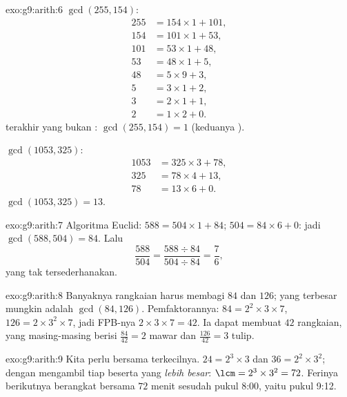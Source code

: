 \begin{solution}{exo:g9:arith:6}
$\gcd(255, 154)$:
\begin{align*}
255 &= 154 \times 1 + 101, \\
154 &= 101 \times 1 + 53, \\
101 &= 53 \times 1 + 48, \\
53 &= 48 \times 1 + 5, \\
48 &= 5 \times 9 + 3, \\
5 &= 3 \times 1 + 2, \\
3 &= 2 \times 1 + 1, \\
2 &= 1 \times 2 + 0 .
\end{align*}
 terakhir yang bukan : $\gcd(255, 154) = 1$ (keduanya ).

$\gcd(1053, 325)$:
\begin{align*}
1053 &= 325 \times 3 + 78, \\
325 &= 78 \times 4 + 13, \\
78 &= 13 \times 6 + 0 .
\end{align*}
$\gcd(1053, 325) = 13$.
\end{solution}

\begin{solution}{exo:g9:arith:7}
Algoritma Euclid: $588 = 504 \times 1 + 84$; $504 = 84 \times 6 + 0$:
jadi $\gcd(588, 504) = 84$. Lalu
\[
\frac{588}{504} = \frac{588 \div 84}{504 \div 84} = \frac{7}{6},
\]
yang tak tersederhanakan.
\end{solution}

\begin{solution}{exo:g9:arith:8}
Banyaknya rangkaian harus membagi $84$ dan $126$; yang terbesar
mungkin adalah $\gcd(84, 126)$. Pemfaktorannya: $84 = 2^2 \times 3
\times 7$, $126 = 2 \times 3^2 \times 7$, jadi FPB-nya
$2 \times 3 \times 7 = 42$. Ia dapat membuat $42$ rangkaian, yang
masing-masing berisi
$\frac{84}{42} = 2$ mawar dan $\frac{126}{42} = 3$ tulip.
\end{solution}

\begin{solution}{exo:g9:arith:9}
Kita perlu  bersama terkecilnya. $24 = 2^3 \times 3$ dan
$36 = 2^2 \times 3^2$; dengan mengambil tiap  beserta
 yang \emph{lebih besar}: $\lcm = 2^3 \times 3^2 = 72$.
Ferinya berikutnya berangkat bersama $72$ menit sesudah pukul 8:00,
yaitu pukul 9:12.
\end{solution}

